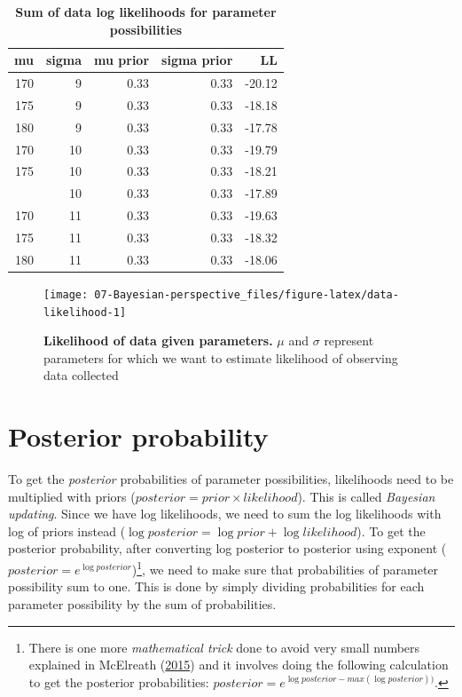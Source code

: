 \documentclass[
]{book}
\begin{document}
\begin{table}

\caption{\label{tab:bayes-height-grid-log-likelihood-product}\textbf{Sum of data log likelihoods for parameter possibilities}}
\centering
\begin{tabular}[t]{rrrrr}
\toprule
mu & sigma & mu prior & sigma prior & LL\\
\midrule
170 & 9 & 0.33 & 0.33 & -20.12\\
175 & 9 & 0.33 & 0.33 & -18.18\\
180 & 9 & 0.33 & 0.33 & -17.78\\
170 & 10 & 0.33 & 0.33 & -19.79\\
175 & 10 & 0.33 & 0.33 & -18.21\\
\addlinespace
180 & 10 & 0.33 & 0.33 & -17.89\\
170 & 11 & 0.33 & 0.33 & -19.63\\
175 & 11 & 0.33 & 0.33 & -18.32\\
180 & 11 & 0.33 & 0.33 & -18.06\\
\bottomrule
\end{tabular}
\end{table}

\begin{figure}

{\centering \texttt{[image: 07-Bayesian-perspective\_files/figure-latex/data-likelihood-1]} 

}

\caption{\textbf{Likelihood of data given parameters. }\(\mu\) and \(\sigma\) represent parameters for which we want to estimate likelihood of observing data collected}\label{fig:data-likelihood}
\end{figure}



\hypertarget{posterior-probability}{%
\section{Posterior probability}\label{posterior-probability}}

To get the \emph{posterior} probabilities of parameter possibilities, likelihoods need to be multiplied with priors (\(posterior = prior \times likelihood\)). This is called \emph{Bayesian updating}. Since we have log likelihoods, we need to sum the log likelihoods with log of priors instead (\(\log{posterior} = \log{prior} + \log{likelihood}\)). To get the posterior probability, after converting log posterior to posterior using exponent (\(posterior = e^{\log{posterior}}\))\footnote{There is one more \emph{mathematical trick} done to avoid very small numbers explained in McElreath (\protect\hyperlink{ref-mcelreathStatisticalRethinkingBayesian2015}{2015}) and it involves doing the following calculation to get the posterior probabilities: \(posterior = e^{\log{posterior} - max(\log{posterior}))}\).}, we need to make sure that probabilities of parameter possibility sum to one. This is done by simply dividing probabilities for each parameter possibility by the sum of probabilities.
\end{document}
